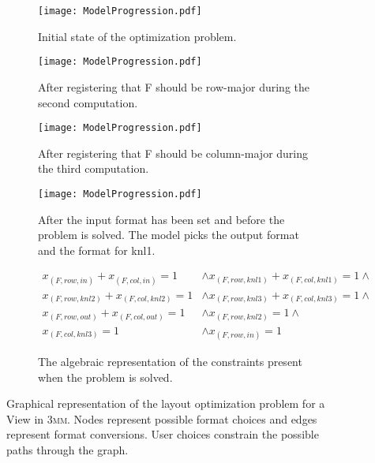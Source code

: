\begin{figure}
	\begin{subfigure}[t]{0.2\textwidth}
		\texttt{[image: ModelProgression.pdf]}
		\caption{Initial state of the optimization problem.}\label{graphModel:1}
	\end{subfigure}
	\hspace{0.05\textwidth}
	\begin{subfigure}[t]{0.2\textwidth}
		\texttt{[image: ModelProgression.pdf]}
		\caption{After registering that F should be row-major during the second computation.}\label{graphModel:2}
	\end{subfigure}

	\begin{subfigure}[t]{0.2\textwidth}
		\texttt{[image: ModelProgression.pdf]}
		\caption{After registering that F should be column-major during the third computation.}\label{graphModel:3}
	\end{subfigure}
	\hspace{0.05\textwidth}
	\begin{subfigure}[t]{0.2\textwidth}
		\texttt{[image: ModelProgression.pdf]}
		\caption{After the input format has been set and before the problem is solved. The model picks the output format and the format for knl1.}\label{graphModel:4}
	\end{subfigure}

	\vspace{5px}

	\begin{subfigure}{0.45\textwidth}
		\begin{align*}
			x_{(F,row,in)} + x_{(F,col,in)} = 1 &\wedge 
		x_{(F,row,knl1)} + x_{(F,col,knl1)} = 1 \wedge \\
		x_{(F,row,knl2)} + x_{(F,col,knl2)} = 1 &\wedge 
		x_{(F,row,knl3)} + x_{(F,col,knl3)} = 1 \wedge \\
		x_{(F,row,out)} + x_{(F,col,out)} = 1 &\wedge 
		x_{(F,row,knl2)} = 1 \wedge\\
			x_{(F,col,knl3)} = 1 &\wedge x_{(F,row,in)} = 1
		\end{align*}
		
		\caption{The algebraic representation of the constraints present when the problem is solved.}\label{graphModel:5}
	\end{subfigure}

	\caption{Graphical representation of the layout optimization problem for a View in \textsc{3mm}. Nodes represent possible format choices and edges represent format conversions. User choices constrain the possible paths through the graph.}\label{graphModel}
\end{figure}

